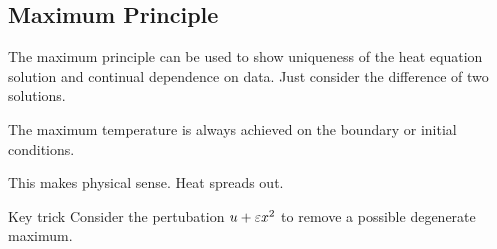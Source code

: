 \subsection{Maximum Principle}
The maximum principle can be used to show uniqueness of the heat equation solution and continual dependence on data. Just consider the difference of two solutions.
\begin{thm}
    The maximum temperature is always achieved on the boundary or initial conditions.
\end{thm}
\begin{remark}
    This makes physical sense. Heat spreads out.
\end{remark}
\begin{details}{Key trick}
    Consider the pertubation $u + \varepsilon x^2$ to remove a possible degenerate maximum.
\end{details}



